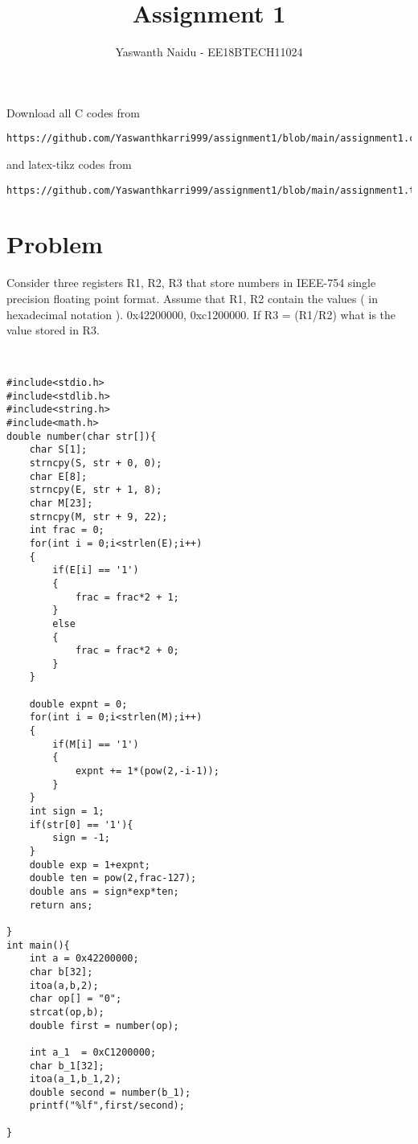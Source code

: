 \documentclass[journal,12pt,twocolumn]{IEEEtran}
\begin{document}
     \def\rightbox#1{\makebox[0in][r]{#1}}
     \def\centbox#1{\makebox[0in]{#1}}
     \def\topbox#1{\raisebox{-\baselineskip}[0in][0in]{#1}}
     \def\midbox#1{\raisebox{-0.5\baselineskip}[0in][0in]{#1}}
\vspace{3cm}
\title{Assignment 1}
\author{Yaswanth Naidu - EE18BTECH11024}
\maketitle
\newpage
\bigskip
\renewcommand{\thefigure}{\theenumi}
\renewcommand{\thetable}{\theenumi}
Download all C codes from 
\begin{lstlisting}
https://github.com/Yaswanthkarri999/assignment1/blob/main/assignment1.c
\end{lstlisting}
%
and latex-tikz codes from 
%
\begin{lstlisting}
https://github.com/Yaswanthkarri999/assignment1/blob/main/assignment1.tex
\end{lstlisting}
\section{Problem}


Consider three registers R1, R2, R3 that store numbers in IEEE-754 single precision floating point format. Assume that R1, R2 contain the values ( in hexadecimal notation ). 0x42200000, 0xc1200000. If R3 = (R1/R2) what is the value stored in R3.






\begin{lstlisting}


#include<stdio.h>
#include<stdlib.h>
#include<string.h>
#include<math.h>
double number(char str[]){
    char S[1];
    strncpy(S, str + 0, 0);
    char E[8];
    strncpy(E, str + 1, 8);
    char M[23];
    strncpy(M, str + 9, 22);
    int frac = 0;
    for(int i = 0;i<strlen(E);i++)
    {
        if(E[i] == '1')
        {
            frac = frac*2 + 1;
        }
        else
        {
            frac = frac*2 + 0;
        }
    }
    
    double expnt = 0;
    for(int i = 0;i<strlen(M);i++)
    {
        if(M[i] == '1')
        {
            expnt += 1*(pow(2,-i-1));
        }
    }
    int sign = 1;
    if(str[0] == '1'){
        sign = -1;
    }
    double exp = 1+expnt;
    double ten = pow(2,frac-127);
    double ans = sign*exp*ten;
	return ans;
	
}
int main(){
    int a = 0x42200000;
    char b[32];
    itoa(a,b,2);
    char op[] = "0";
    strcat(op,b);
    double first = number(op);

    int a_1  = 0xC1200000;
    char b_1[32];
    itoa(a_1,b_1,2);
    double second = number(b_1);
    printf("%lf",first/second);
    
}
\end{lstlisting}
\end{document}

